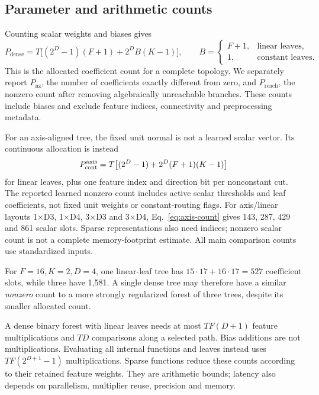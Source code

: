 \documentclass[11pt,a4paper]{article}
\begin{document}
\subsection{Parameter and arithmetic counts}
Counting scalar weights and biases gives
\begin{equation}
 P_{\mathrm{dense}}=T\big[(2^D-1)(F+1)+2^D B(K-1)\big],
 \qquad B=\begin{cases}F+1,&\text{linear leaves},\\1,&\text{constant leaves}.
 \end{cases}
 \label{eq:count}
\end{equation}
This is the allocated coefficient count for a complete topology. We separately
report $P_{\mathrm{nz}}$, the number of coefficients exactly different from
zero, and $P_{\mathrm{reach}}$, the nonzero count after removing algebraically
unreachable branches. These counts include biases and exclude feature indices,
connectivity and preprocessing metadata.

For an axis-aligned tree, the fixed unit normal is not a learned scalar
vector. Its continuous allocation is instead
\begin{equation}
 P_{\rm cont}^{\rm axis}=T\big[(2^D-1)+2^D(F+1)(K-1)\big]
 \label{eq:axis-count}
\end{equation}
for linear leaves, plus one feature index and direction bit per nonconstant
cut. The reported learned nonzero count includes active scalar thresholds
and leaf coefficients, not fixed unit weights or constant-routing flags.
For axis/linear layouts 1$\times$D3, 1$\times$D4, 3$\times$D3 and 3$\times$D4,
Eq.~\eqref{eq:axis-count} gives 143, 287, 429 and 861 scalar slots. Sparse
representations also need indices; nonzero scalar count is not a complete
memory-footprint estimate. All main comparison counts use standardized inputs.

For $F=16,K=2,D=4$, one linear-leaf tree has $15\cdot17+16\cdot17=527$
coefficient slots, while three have 1,581. A single dense tree may therefore
have a similar \emph{nonzero} count to a more strongly regularized forest
of three trees, despite its smaller allocated count.

A dense binary forest with linear leaves needs at most $TF(D+1)$ feature
multiplications and $TD$ comparisons along a selected path. Bias additions
are not multiplications. Evaluating all internal functions and leaves instead
uses $TF(2^{D+1}-1)$ multiplications. Sparse functions reduce these counts
according to their retained feature weights. They are arithmetic bounds;
latency also depends on parallelism, multiplier reuse, precision and memory.
\end{document}
